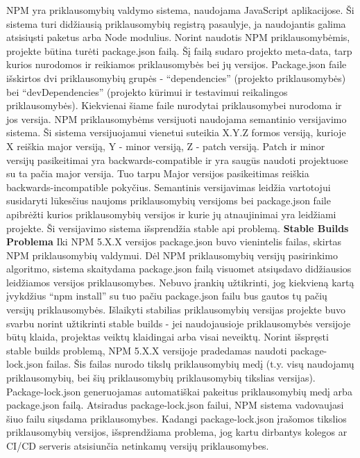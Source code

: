 NPM yra priklausomybių valdymo sistema, naudojama JavaScript aplikacijose. Ši sistema turi didžiausią priklausomybių registrą pasaulyje, ja naudojantis galima atsisiųsti paketus arba Node modulius.
\bigbreak
Norint naudotis NPM priklausomybėmis, projekte būtina turėti package.json failą. Šį failą sudaro projekto meta-data, tarp kurios nurodomos ir reikiamos priklausomybės bei jų versijos. Package.json faile išskirtos dvi priklausomybių grupės - “dependencies” (projekto priklausomybės) bei “devDependencies” (projekto kūrimui ir testavimui reikalingos priklausomybės). Kiekvienai šiame faile nurodytai priklausomybei nurodoma ir jos versija.
\bigbreak
NPM priklausomybėms versijuoti naudojama semantinio versijavimo sistema. Ši sistema versijuojamui vienetui suteikia X.Y.Z formos versiją, kurioje X reiškia major versiją, Y - minor versiją,  Z - patch versiją. Patch ir minor versijų pasikeitimai yra backwards-compatible
ir yra saugūs naudoti projektuose su ta pačia major versija. Tuo tarpu Major versijos pasikeitimas reiškia backwards-incompatible pokyčius. Semantinis versijavimas leidžia vartotojui susidaryti lūkesčius naujoms priklausomybių versijoms bei package.json faile
apibrėžti kurios priklausomybių versijos ir kurie jų atnaujinimai yra leidžiami projekte. Ši versijavimo sistema išsprendžia stable api problemą.
\bigbreak
{\bf Stable Builds Problema}
\bigbreak
Iki NPM 5.X.X versijos package.json buvo vienintelis failas, skirtas NPM priklausomybių valdymui. Dėl NPM priklausomybių versijų pasirinkimo algoritmo, sistema skaitydama package.json failą visuomet atsiųsdavo didžiausios leidžiamos versijos priklausomybes. Nebuvo įrankių užtikrinti, jog kiekvieną kartą įvykdžius “npm install” su tuo pačiu package.json failu bus gautos tų pačių versijų priklausomybės. Išlaikyti stabilias priklausomybių versijas projekte buvo svarbu norint užtikrinti stable builds - jei naudojausioje priklausomybės versijoje būtų klaida, projektas veiktų klaidingai arba visai neveiktų.
\bigbreak
Norint išspręsti stable builds problemą, NPM 5.X.X versijoje pradedamas naudoti  package-lock.json failas. Šis failas nurodo tikslų priklausomybių medį (t.y. visų naudojamų priklausomybių, bei šių priklausomybių priklausomybių tikslias versijas). Package-lock.json generuojamas automatiškai pakeitus priklausomybių medį arba package.json failą. Atsiradus package-lock.json failui, NPM sistema vadovaujasi šiuo failu siųsdama priklausomybes. Kadangi package-lock.json įrašomos tikslios priklausomybių versijos, išsprendžiama problema, jog kartu dirbantys kolegos ar CI/CD serveris atsisiunčia netinkamų versijų priklausomybes.

